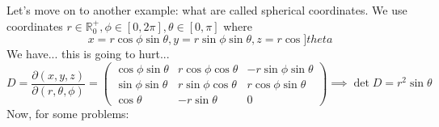 \documentclass{article}
\newcommand{\reals}[0]{\mathbb{R}}
\newcommand{\prt}[2]{\frac{\partial #1}{\partial #2}}
\begin{document}
Let's move on to another example: what are called spherical coordinates. We use coordinates \(r \in \reals^+_0, \phi \in [0, 2\pi], \theta \in [0, \pi]\) where
\begin{equation}
  x = r\cos\phi\sin\theta, y = r\sin\phi\sin\theta, z = r\cos]theta
\end{equation}
We have... this is going to hurt...
\begin{equation}
  D = \prt{(x, y, z)}{(r, \theta, \phi)} = \begin{pmatrix}
    \cos\phi\sin\theta & r\cos\phi\cos\theta & -r\sin\phi\sin\theta \\
    \sin\phi\sin\theta & r\sin\phi\cos\theta & r\cos\phi\sin\theta \\
    \cos\theta & -r\sin\theta & 0
  \end{pmatrix} \implies \det D = r^2\sin\theta
\end{equation}
Now, for some problems:
\end{document}
